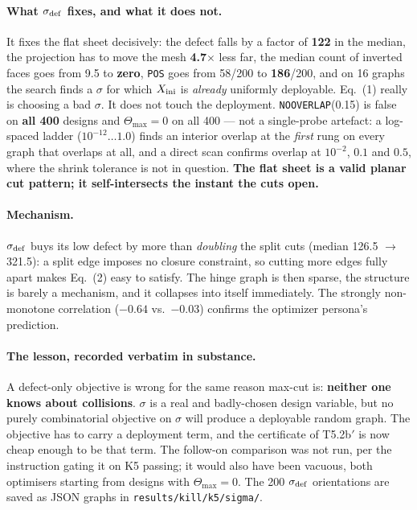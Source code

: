 \documentclass[10pt,a4paper]{article}
\newcommand{\fn}[1]{\nolinkurl{#1}}
\begin{document}
\paragraph{What $\sigma_{\rm def}$ fixes, and what it does not.} It fixes the flat sheet
decisively: the defect falls by a factor of \textbf{122} in the median, the projection has to
move the mesh \textbf{4.7$\times$} less far, the median count of inverted faces goes from 9.5 to
\textbf{zero}, \texttt{POS} goes from 58/200 to \textbf{186}/200, and on 16 graphs the search
finds a $\sigma$ for which $X_{\rm ini}$ is \emph{already} uniformly deployable. Eq.~(1) really
is choosing a bad $\sigma$.
It does not touch the deployment. \texttt{NOOVERLAP}(0.15) is false on \textbf{all 400} designs
and $\Theta_{\max}=0$ on all 400 --- not a single-probe artefact: a log-spaced ladder
($10^{-12}\ldots1.0$) finds an interior overlap at the \emph{first} rung on every graph that
overlaps at all, and a direct scan confirms overlap at $10^{-2}$, $0.1$ and $0.5$, where the
shrink tolerance is not in question. \textbf{The flat sheet is a valid planar cut pattern; it
self-intersects the instant the cuts open.}

\paragraph{Mechanism.} $\sigma_{\rm def}$ buys its low defect by more than \emph{doubling} the
split cuts (median 126.5 $\to$ 321.5): a split edge imposes no closure constraint, so cutting
more edges fully apart makes Eq.~(2) easy to satisfy. The hinge graph is then sparse, the
structure is barely a mechanism, and it collapses into itself immediately. The strongly
non-monotone correlation ($-0.64$ vs.\ $-0.03$) confirms the optimizer persona's prediction.

\paragraph{The lesson, recorded verbatim in substance.} A defect-only objective is wrong for the
same reason max-cut is: \textbf{neither one knows about collisions}. $\sigma$ is a real and
badly-chosen design variable, but no purely combinatorial objective on $\sigma$ will produce a
deployable random graph. The objective has to carry a deployment term, and the certificate of
T5.2b$'$ is now cheap enough to be that term.
The follow-on comparison was not run, per the instruction gating it on K5 passing; it would also
have been vacuous, both optimisers starting from designs with $\Theta_{\max}=0$.
The 200 $\sigma_{\rm def}$ orientations are saved as JSON graphs in
\fn{results/kill/k5/sigma/}.
\end{document}
